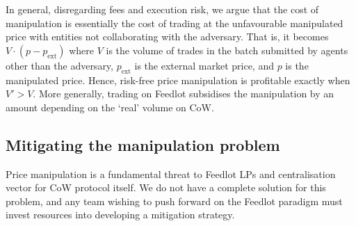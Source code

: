 \documentclass[a4paper,10pt]{article}
\theoremstyle{remark}
\begin{document}
In general, disregarding fees and execution risk, we argue that the cost of manipulation is essentially the cost of trading at the unfavourable manipulated price with entities not collaborating with the adversary. 
%
That is, it becomes $V\cdot(p - p_\mathrm{ext})$ where $V$ is the volume of trades in the batch submitted by agents other than the adversary, $p_\mathrm{ext}$ is the external market price, and $p$ is the manipulated price.
%
Hence, risk-free price manipulation is profitable exactly when $V'>V$.
%
More generally, trading on Feedlot subsidises the manipulation by an amount depending on the `real' volume on CoW.

\subsection{Mitigating the manipulation problem}
\label{mitigation}

Price manipulation is a fundamental threat to Feedlot LPs and centralisation vector for CoW protocol itself. 
%
We do not have a complete solution for this problem, and any team wishing to push forward on the Feedlot paradigm must invest resources into developing a mitigation strategy.
\end{document}
